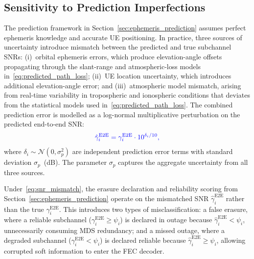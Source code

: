 \documentclass[lettersize,journal]{IEEEtran}
\providecommand{\DIFadd}[1]{{\protect\color{blue}#1}} %
\begin{document}
{\color{blue}
\subsection{\DIFadd{Sensitivity to Prediction Imperfections}}
\label{sec:robustness_prediction}

\DIFadd{The prediction framework in Section~\ref{sec:ephemeris_prediction}
assumes perfect ephemeris knowledge and accurate UE positioning.
In practice, three sources of uncertainty introduce mismatch
between the predicted and true subchannel SNRs:
(i)~orbital ephemeris errors, which produce elevation-angle
offsets propagating through the slant-range
and atmospheric-loss models in~\eqref{eq:predicted_path_loss};
(ii)~UE location uncertainty, which introduces additional
elevation-angle error; and
(iii)~atmospheric model mismatch, arising from real-time
variability in tropospheric and ionospheric conditions that
deviates from the statistical models used
in~\eqref{eq:predicted_path_loss}. The combined prediction error is modelled as a log-normal
multiplicative perturbation on the predicted end-to-end SNR:
}\begin{equation}
\DIFadd{\hat{\gamma}_i^{\mathrm{E2E}} =
\gamma_i^{\mathrm{E2E}} \cdot 10^{\delta_i/10},
\label{eq:snr_mismatch}
}\end{equation}
\DIFadd{where $\delta_i \sim \mathcal{N}(0, \sigma_p^2)$ are
independent prediction error terms with standard deviation
$\sigma_p$~(dB).
The parameter $\sigma_p$ captures the aggregate uncertainty
from all three sources.
}

\DIFadd{Under~\eqref{eq:snr_mismatch}, the erasure declaration and
reliability scoring from Section~\ref{sec:ephemeris_prediction}
operate on the mismatched SNR $\hat{\gamma}_i^{\mathrm{E2E}}$
rather than the true $\gamma_i^{\mathrm{E2E}}$.
This introduces two types of misclassification:
a false erasure, where a reliable subchannel
($\gamma_i^{\mathrm{E2E}} \geq \psi_i$) is declared in outage
because $\hat{\gamma}_i^{\mathrm{E2E}} < \psi_i$,
unnecessarily consuming MDS redundancy;
and a missed outage, where a degraded subchannel
($\gamma_i^{\mathrm{E2E}} < \psi_i$) is declared reliable
because $\hat{\gamma}_i^{\mathrm{E2E}} \geq \psi_i$,
allowing corrupted soft information to enter the FEC decoder.
}

}
\end{document}
